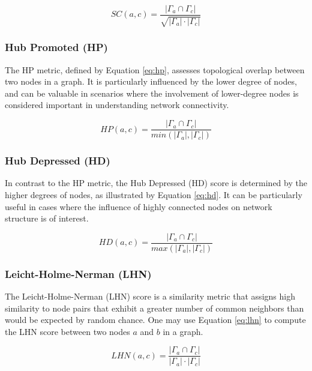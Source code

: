 \begin{equation}
\label{eq:sc}
  SC(a, c) = \frac{|\Gamma_a \cap \Gamma_c|}{\sqrt{|\Gamma_a| \cdot |\Gamma_c|}}
\end{equation}


\subsubsection{Hub Promoted (HP)}

The HP \cite{liben2003link} metric, defined by Equation \ref{eq:hp}, assesses topological overlap between two nodes in a graph. It is particularly influenced by the lower degree of nodes, and can be valuable in scenarios where the involvement of lower-degree nodes is considered important in understanding network connectivity.

\begin{equation}
\label{eq:hp}
  HP(a, c) = \frac{|\Gamma_a \cap \Gamma_c|}{min(|\Gamma_a|, |\Gamma_c|)}
\end{equation}


\subsubsection{Hub Depressed (HD)}

In contrast to the HP metric, the Hub Depressed (HD) score \cite{zhou2009predicting} is determined by the higher degrees of nodes, as illustrated by Equation \ref{eq:hd}. It can be particularly useful in cases where the influence of highly connected nodes on network structure is of interest.

\begin{equation}
\label{eq:hd}
  HD(a, c) = \frac{|\Gamma_a \cap \Gamma_c|}{max(|\Gamma_a|, |\Gamma_c|)}
\end{equation}


\subsubsection{Leicht-Holme-Nerman (LHN)}

The Leicht-Holme-Nerman (LHN) score \cite{leicht2006vertex} is a similarity metric that assigns high similarity to node pairs that exhibit a greater number of common neighbors than would be expected by random chance. One may use Equation \ref{eq:lhn} to compute the LHN score between two nodes $a$ and $b$ in a graph.

\begin{equation}
\label{eq:lhn}
  LHN(a, c) = \frac{|\Gamma_a \cap \Gamma_c|}{|\Gamma_a| \cdot |\Gamma_c|}
\end{equation}


